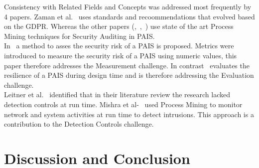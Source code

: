 \documentclass[runningheads]{llncs}
\begin{document}
Consistency with Related Fields and Concepts was addressed most frequently by 4 papers. Zaman et al.~\cite{Zaman20192982} uses standards and recoommendations that evolved based on the GDPR. Whereas the other papers (\cite{Accorsi20131462},~\cite{Zahoransky2014360},~\cite{Dedousis202235})
use state of the art Process Mining techniques for Security Auditing in PAIS.\\
In~\cite{Dedousis202235} a method to asses the security risk of a PAIS is proposed. Metrics were introduced to measure the security risk of a PAIS using numeric values, this paper therefore addresses the Measurement challenge. In contrast~\cite{Zahoransky2014360}
evaluates the resilience of a PAIS during design time and is therefore addressing the Evaluation challenge.\\
Leitner et al.~\cite{Leitner2014273} identified that in their literature review the research lacked detection controls at run time. Mishra et al-~\cite{Mishra2018613} used Process Mining to monitor network and system activities at run time to detect intrusions.
This approach is a contribution to the Detection Controls challenge.\\


\section{Discussion and Conclusion}\label{Conclusion}

%
%
% 
% 
%

{}
\end{document}
